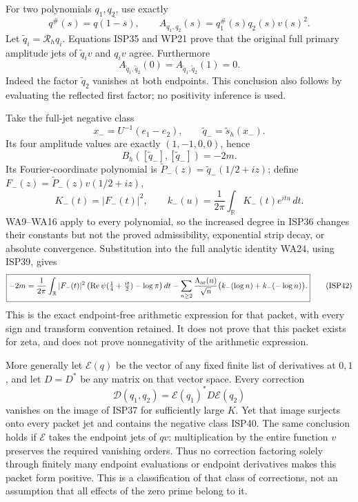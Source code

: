 \documentclass[
  10pt,
  a4paper,
]{article}
\begin{document}
For two polynomials \(q_1,q_2\), use exactly \[
q^\#(s)=\overline{q(1-\overline s)},\qquad
A_{q_1,q_2}(s)=q_1^\#(s)q_2(s)v(s)^2.
\tag{ISP38}
\] Let \(\widetilde q_i=\mathcal R_hq_i\). Equations ISP35 and WP21
prove that the original full primary amplitude jets of
\(\widetilde q_iv\) and \(q_iv\) agree. Furthermore \[
A_{\widetilde q_1,\widetilde q_2}(0)
=A_{\widetilde q_1,\widetilde q_2}(1)=0.
\tag{ISP39}
\] Indeed the factor \(\widetilde q_2\) vanishes at both endpoints. This
conclusion also follows by evaluating the reflected first factor; no
positivity inference is used.

Take the full-jet negative class \[
x_-=U^{-1}(e_1-e_2),\qquad
\widetilde q_- =\widetilde s_h(x_-).
\tag{ISP40}
\] Its four amplitude values are exactly \((1,-1,0,0)\), hence \[
B_h([\widetilde q_-],[\widetilde q_-])=-2m.
\tag{ISP41}
\] Its Fourier-coordinate polynomial is
\(\widetilde P_-(z)=\widetilde q_-(1/2+iz)\); define
\(F_-(z)=\widetilde P_-(z)v(1/2+iz)\), \[
K_-(t)=|F_-(t)|^2,\qquad
k_-(u)=\frac1{2\pi}\int_{\mathbb R}K_-(t)e^{itu}\,dt.
\] WA9--WA16 apply to every polynomial, so the increased degree in ISP36
changes their constants but not the proved admissibility, exponential
strip decay, or absolute convergence. Substitution into the full
analytic identity WA24, using ISP39, gives \[
\boxed{-2m=
\frac1{2\pi}\int_{\mathbb R}|F_-(t)|^2
\left(\operatorname{Re}\psi(\tfrac14+\tfrac{it}{2})-\log\pi\right)dt
-\sum_{n\ge2}\frac{\Lambda_{\rm ar}(n)}{\sqrt n}
\bigl(k_-(\log n)+k_-(-\log n)\bigr).}
\tag{ISP42}
\] This is the exact endpoint-free arithmetic expression for that
packet, with every sign and transform convention retained. It does not
prove that this packet exists for zeta, and does not prove nonnegativity
of the arithmetic expression.

More generally let \(\mathcal E(q)\) be the vector of any fixed finite
list of derivatives at \(0,1\), and let \(D=D^*\) be any matrix on that
vector space. Every correction \[
\mathcal D(q_1,q_2)=\mathcal E(q_1)^*D\mathcal E(q_2)
\tag{ISP43}
\] vanishes on the image of ISP37 for sufficiently large \(K\). Yet that
image surjects onto every packet jet and contains the negative class
ISP40. The same conclusion holds if \(\mathcal E\) takes the endpoint
jets of \(qv\): multiplication by the entire function \(v\) preserves
the required vanishing orders. Thus no correction factoring solely
through finitely many endpoint evaluations or endpoint derivatives makes
this packet form positive. This is a classification of that class of
corrections, not an assumption that all effects of the zero prime belong
to it.
\end{document}
